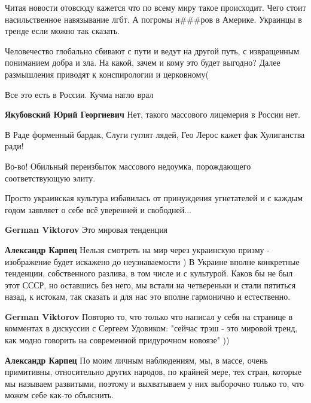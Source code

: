 \begin{itemize}
\begin{itemize}
\end{itemize} %


Читая новости отовсюду кажется что по всему миру такое происходит. Чего стоит
насильственное навязывание лгбт. А погромы н\#\#\#ров в Америке. Украинцы в тренде
если можно так сказать.

Человечество глобально сбивают с пути и ведут на другой путь, с извращенным
пониманием добра и зла. На какой, зачем и кому это будет выгодно? Далее
размышления приводят к конспирологии и церковному(


Все это есть в России. Кучма нагло врал

\begin{itemize} %
\textbf{Якубовский Юрий Георгиевич} Нет, такого массового лицемерия в России нет.
\end{itemize} %


\obeycr
В Раде форменный бардак,
Слуги гуглят лядей,
Гео Лерос кажет фак
Хулиганства ради!
\restorecr

Во-во! Обильный переизбыток массового недоумка, порождающего соответствующую элиту.

Просто украинская культура избавилась от принуждения угнетателей и с каждым годом заявляет о себе всё уверенней и свободней...

\begin{itemize} %
\textbf{German Viktorov} Это мировая тенденция

\textbf{Александр Карпец} Нельзя смотреть на мир через украинскую призму - изображение будет искажено до неузнаваемости ) В Украине вполне конкретные тенденции, собственного разлива, в том числе и с культурой. Каков бы не был этот СССР, но оставшись без него, мы встали на четвереньки и стали пятиться назад, к истокам, так сказать и для нас это вполне гармонично и естественно.

\textbf{German Viktorov} Повторю то, что только что написал у себя на странице в комментах в дискуссии с Сергеем Удовиком:
"сейчас трэш - это мировой тренд, как модно говорить на современной придурочном новоязе" ))

\textbf{Александр Карпец} По моим личным наблюдениям, мы, в массе, очень примитивны, относительно других народов, по крайней мере, тех стран, которые мы называем развитыми, поэтому и выхватываем у них выборочно только то, что можем себе как-то объяснить.


\end{itemize}
\end{itemize}
